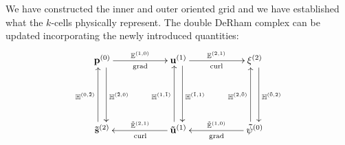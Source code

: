 We have constructed the inner and outer oriented grid and we have established what the $k$-cells physically represent. The double DeRham complex can be updated incorporating the newly introduced quantities:
\begin{equation}
    \begin{gathered}
        \xymatrix@=13ex{
            \mathbf{p}^{(0)} \ar[r]^{\mathbb{E}^{(1,0)}}_{\text{grad}} \ar@<1ex>[d]^{\mathbb{H}^{(\tilde{2},0)}} & \mathbf{u}^{(1)} \ar[r]^{\mathbb{E}^{(2,1)}}_{\text{curl}} \ar@<1ex>[d]^{\mathbb{H}^{(\tilde{1},1)}} & \mathbf{\xi}^{(2)} \ar@<1ex>[d]^{\mathbb{H}^{(\tilde{0},2)}} \\
            \mathbf{\tilde{s}}^{(2)} \ar@<1ex>[u]^{\mathbb{H}^{(0,\tilde{2})}} & \mathbf{\tilde{u}}^{(1)} \ar[l]_{\tilde{\mathbb{E}}^{(2, 1)}}^{\text{curl}} \ar@<1ex>[u]^{\mathbb{H}^{(1,\tilde{1})}} & \mathbf{\tilde{\psi}}^{(0)} \ar[l]_{\tilde{\mathbb{E}}^{(1,0)}}^{\text{grad}} \ar@<1ex>[u]^{\mathbb{H}^{(2,\tilde{0})}}
        }
    \end{gathered}
\end{equation}

